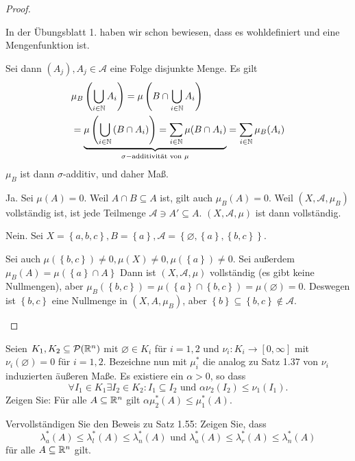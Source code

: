 \begin{proof}
	\begin{parts}
	\item In der Übungsblatt 1. haben wir schon bewiesen, dass es wohldefiniert und eine Mengenfunktion ist.

		Sei dann $(A_j), A_j\in \mathcal{A}$ eine Folge disjunkte Menge. Es gilt
	\begin{align*}
		&\mu_B\left( \bigcup_{i\in\mathbb{N}} A_i \right) =\mu\left( B\cap \bigcup_{i\in \mathbb{N}} A_i \right)\\
		&=\underbrace{\mu\left( \bigcup_{i\in \mathbb{N}} \left( B \cap A_i \right)  \right)=\sum_{i\in \mathbb{N}}\mu(B\cap A_i)}_{\sigma-\text{additivität von }\mu}=\sum_{i\in \mathbb{N}}\mu_B(A_i)
	\end{align*}
		$\mu_B$ ist dann $\sigma$-additiv, und daher Maß.
	\item Ja. Sei $\mu(A)=0$. Weil $A\cap B\subseteq A$ ist, gilt auch $\mu_B(A)=0$. Weil $(X,\mathcal{A},\mu_B)$ vollständig ist, ist jede Teilmenge $\mathcal{A}\ni A' \subseteq A$. $(X, \mathcal{A},\mu)$ ist dann vollständig.
	\item Nein. Sei $X=\left\{ a,b,c \right\},B=\left\{ a \right\}, \mathcal{A}=\left\{\varnothing, \left\{ a \right\} , \left\{ b,c \right\}  \right\} $.

		Sei auch $\mu(\left\{ b,c \right\}) \neq 0, \mu(X)\neq 0, \mu(\left\{ a \right\} )\neq 0$. Sei außerdem $\mu_B(A)=\mu\left( \left\{ a \right\}\cap A \right\}$ Dann ist $(X, \mathcal{A},\mu)$ vollständig (es gibt keine Nullmengen), aber $\mu_B(\left\{ b,c \right\} )=\mu(\left\{ a \right\} \cap \left\{ b,c \right\} )=\mu(\varnothing)=0$. Deswegen ist $\left\{ b,c \right\} $ eine Nullmenge in $(X,A,\mu_B)$, aber $\left\{ b \right\} \subseteq \left\{b ,c \right\} \not\in \mathcal{A}$.\qedhere
	\end{parts}
\end{proof}
\begin{Problem}
	\begin{parts}
\item	Seien $K_1 , K_2 \subseteq \mathcal{P}(\mathbb{R}^n)$ mit $\varnothing \in K_i$ für $i = 1, 2$ und $\nu_i : K_i \to [0, \infty]$ mit $\nu_i (\varnothing) = 0$ für $i = 1, 2$. Bezeichne nun mit $\mu^*_i$ die analog zu Satz 1.37 von $\nu_i$ induzierten äußeren Maße. Es existiere ein $\alpha > 0$, so dass
	\[
		\forall I_1\in K_1\exists I_2\in K_2: I_1\subseteq I_2\text{ und }\alpha \nu_2(I_2)\le \nu_1(I_1)
	.\] 
	Zeigen Sie: F\"{u}r alle $A\subseteq \mathbb{R}^n$ gilt $\alpha\mu_2^*(A)\le \mu_1^*(A)$.
\item Vervollständigen Sie den Beweis zu Satz 1.55: Zeigen Sie, dass
	\[
		\lambda_a^*(A)\le \lambda_l^*(A)\le \lambda_n^*(A)\text{ und }\lambda_a^*(A)\le \lambda_r^* (A)\le \lambda_n^*(A)\]
		f\"{u}r alle $A\subseteq \mathbb{R}^n$ gilt.
	\end{parts}
\end{Problem}
